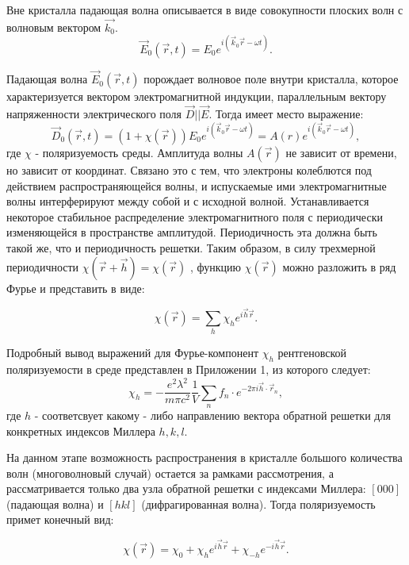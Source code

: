 
Вне кристалла падающая волна описывается в виде совокупности плоских волн с волновым вектором  $\vec{k_0}$.
\begin{equation}
  \vec{E}_0(\vec{r},t) = E_0 e^{i(\vec{k}_0\vec{r}-\omega t)}.
 \end{equation}

Падающая волна $\vec{E}_0(\vec{r},t)$ порождает волновое поле внутри кристалла, которое характеризуется вектором
электромагнитной индукции, параллельным вектору напряженности электрического поля $\vec{D}||\vec{E}$. Тогда
имеет место выражение:
\begin{equation}
 \vec{D}_0(\vec{r},t) = (1+\chi(\vec{r})) E_0 e^{i(\vec{k}_0\vec{r}-\omega t)} = A(r) e^{i(\vec{k}_0\vec{r}-\omega t)},
\end{equation}
 \noindent
где $\chi$ - поляризуемость среды. Амплитуда волны $A(\vec{r})$ не зависит
от времени, но зависит от координат. Связано это с тем, что электроны колеблются
под действием распространяющейся волны, и испускаемые ими электромагнитные волны
интерферируют между собой и с исходной волной. Устанавливается некоторое стабильное распределение
электромагнитного поля с периодически изменяющейся в пространстве амплитудой. Периодичность эта должна быть
такой же, что и периодичность решетки. Таким образом, в силу трехмерной периодичности $\chi(\vec{r}+\vec{h}) = \chi(\vec{r})$
, функцию $\chi(\vec{r})$ можно разложить в ряд Фурье и представить в виде:

\begin{equation}
\chi(\vec{r}) = \sum_{h}\chi_h e^{i\vec{h}\vec{r}}.
\end{equation}

Подробный вывод выражений для Фурье-компонент $\chi_h$ рентгеновской поляризуемости
 в среде представлен в Приложении 1, из которого следует:
\begin{equation}
\chi_h = -\frac{e^2 \lambda^2}{m \pi c^2} \frac{1}{V} \sum_{n} f_n \cdot e^{-2\pi i\vec{h}\cdot \vec{r}_n},
\end{equation}
\noindent
где $h$ - соответсвует какому - либо направлению вектора обратной решетки для конкретных индексов Миллера $h, k, l$.

На данном этапе возможность распространения в кристалле большого количества
волн (многоволновый случай) остается за рамками рассмотрения, а
рассматривается только два узла обратной решетки с индексами Миллера:
$[000]$ (падающая волна) и $[hkl]$ (дифрагированная волна).
Тогда поляризуемость примет конечный вид:

\begin{equation}
\chi(\vec{r}) = \chi_0 + \chi_h e^{i\vec{h}\vec{r}} + \chi_{-h} e^{-i\vec{h}\vec{r}}.
\end{equation}

